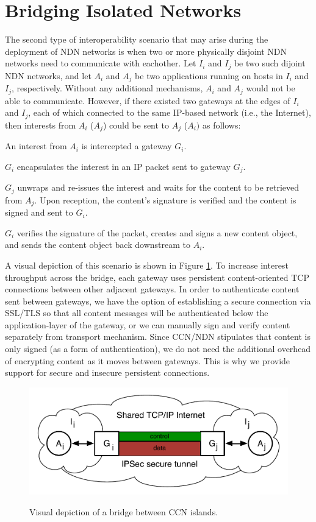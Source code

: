 \section{Bridging Isolated Networks} \label{sec:bridge}
The second type of interoperability scenario that may arise during the deployment of NDN networks is when two or more physically disjoint NDN networks need to communicate with eachother. Let $I_i$ and $I_j$ be two such dijoint NDN networks, and let $A_i$ and $A_j$ be two applications running on hosts in $I_i$ and $I_j$, respectively. Without any additional mechanisms, $A_i$ and $A_j$ would not be able to communicate. However, if there existed two gateways at the edges of $I_i$ and $I_j$, each of which connected to the same IP-based network (i.e., the Internet), then interests from $A_i$ ($A_j$) could be sent to $A_j$ ($A_i)$ as follows:
\begin{compactenum} 
	\item An interest from $A_i$ is intercepted a gateway $G_i$.
	\item $G_i$ encapsulates the interest in an IP packet sent to gateway $G_j$.
	\item $G_j$ unwraps and re-issues the interest and waits for the content to be retrieved from $A_j$. Upon reception, the content's signature is verified and the content is signed and sent to $G_i$. 
	\item $G_i$ verifies the signature of the packet, creates and signs a new content object, and sends the content object back downstream to $A_i$.
\end{compactenum}
A visual depiction of this scenario is shown in Figure \ref{fig:islands}. To increase interest throughput across the bridge, each gateway uses persistent content-oriented TCP connections between other adjacent gateways. In order to authenticate content sent between gateways, we have the option of establishing a secure connection via SSL/TLS so that all content messages will be authenticated below the application-layer of the gateway, or we can manually sign and verify content separately from transport mechanism. Since CCN/NDN stipulates that content is only signed (as a form of authentication), we do not need the additional overhead of encrypting content as it moves between gateways. This is why we provide support for secure and insecure persistent connections. 

\begin{figure}[ht!]
\begin{center}
\includegraphics[scale=0.45]{./images/island_tunnel.pdf}
\label{fig:islands}
\caption{Visual depiction of a bridge between CCN islands.}
\end{center}
\end{figure}

